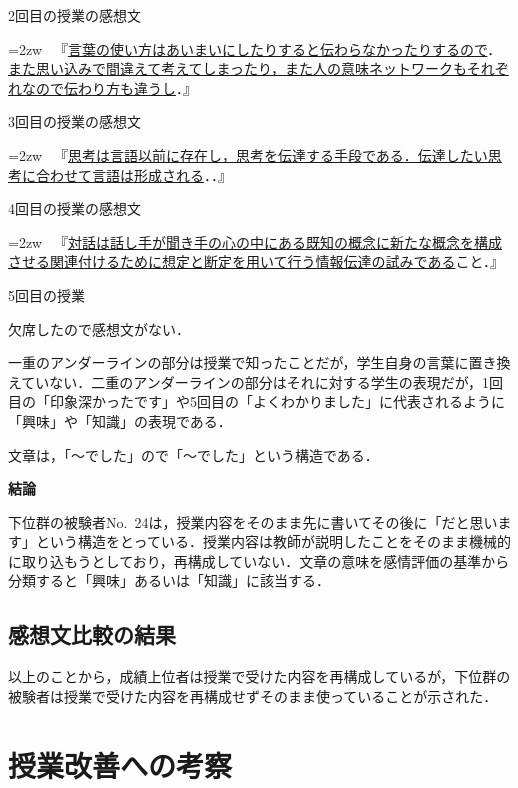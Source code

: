 \documentclass[japanese]{jnlp_1.3a}
\begin{document}
2回目の授業の感想文

\hangindent=2zw
\textbullet~『\ul{言葉の使い方はあいまいにしたりすると伝わらなかったりするので}．\ul{また思い込みで間違えて考えてしまったり，また人の意味ネットワークもそれぞれなので伝わり方も違うし}．』

3回目の授業の感想文

\hangindent=2zw
\textbullet~『\ul{思考は言語以前に存在し，思考を伝達する手段である．伝達したい思考に合わせて言語は形成される}．．』

4回目の授業の感想文

\hangindent=2zw
\textbullet~『\ul{対話は話し手が聞き手の心の中にある既知の概念に新たな概念を構成させる関連付けるために想定と断定を用いて行う情報伝達の試みである}こと．』

5回目の授業

欠席したので感想文がない．

\vspace{\baselineskip}

一重のアンダーラインの部分は授業で知ったことだが，学生自身の言葉に置き換えていない．二重のアンダーラインの部分はそれに対する学生の表現だが，1回目の「印象深かったです」や5回目の「よくわかりました」に代表されるように「興味」や「知識」の表現である．

文章は，「〜でした」ので「〜でした」という構造である．

\vspace{\baselineskip}

\textbf{結論}

下位群の被験者No.~24は，授業内容をそのまま先に書いてその後に「だと思います」という構造をとっている．授業内容は教師が説明したことをそのまま機械的に取り込もうとしており，再構成していない．文章の意味を感情評価の基準から分類すると「興味」あるいは「知識」に該当する． 

\subsection{感想文比較の結果}

以上のことから，成績上位者は授業で受けた内容を再構成しているが，下位群の被験者は授業で受けた内容を再構成せずそのまま使っていることが示された．

\section{授業改善への考察}
\end{document}
